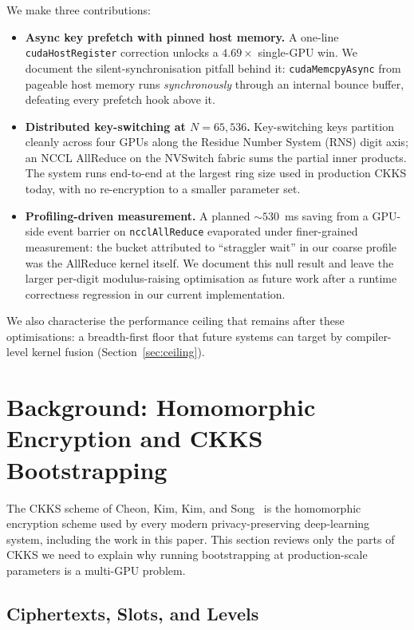 \documentclass[conference]{IEEEtran}
\begin{document}
We make three contributions:
\begin{itemize}
  \item \textbf{Async key prefetch with pinned host memory.} A one-line
  \texttt{cudaHostRegister} correction unlocks a $4.69\times$
  single-GPU win. We document the silent-synchronisation pitfall
  behind it: \texttt{cudaMemcpyAsync} from pageable host memory runs
  \emph{synchronously} through an internal bounce buffer, defeating
  every prefetch hook above it.
  \item \textbf{Distributed key-switching at $N{=}65{,}536$.}
  Key-switching keys partition cleanly across four GPUs along the
  Residue Number System (RNS) digit axis; an NCCL AllReduce on the
  NVSwitch fabric sums the partial inner products. The system runs
  end-to-end at the largest ring size used in production CKKS today,
  with no re-encryption to a smaller parameter set.
  \item \textbf{Profiling-driven measurement.} A planned $\sim 530$~ms
  saving from a GPU-side event barrier on \texttt{ncclAllReduce}
  evaporated under finer-grained measurement: the bucket attributed
  to ``straggler wait'' in our coarse profile was the AllReduce kernel
  itself. We document this null result and leave the larger per-digit
  modulus-raising optimisation as future work after a runtime
  correctness regression in our current implementation.
\end{itemize}
We also characterise the performance ceiling that remains after these
optimisations: a breadth-first floor that future systems can target by
compiler-level kernel fusion (Section~\ref{sec:ceiling}).

\section{Background: Homomorphic Encryption and CKKS Bootstrapping}
\label{sec:background}

The CKKS scheme of Cheon, Kim, Kim, and Song~\cite{Cheon2017} is the
homomorphic encryption scheme used by every modern privacy-preserving
deep-learning system, including the work in this paper. This section
reviews only the parts of CKKS we need to explain why running
bootstrapping at production-scale parameters is a multi-GPU problem.

\subsection{Ciphertexts, Slots, and Levels}
\end{document}
